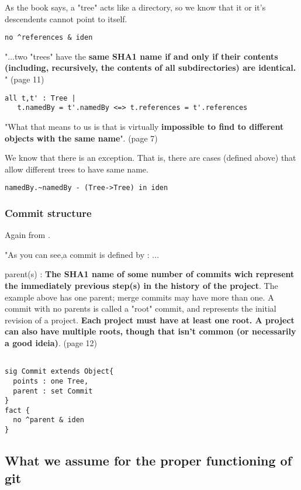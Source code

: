 As the book \cite{gitComm} says, a "tree" acts
like a directory, so we know that it or it's 
descendents cannot point to itself.
\begin{lstlisting}
no ^references & iden 
\end{lstlisting}

"...two "trees" have the { \bf same SHA1 name if and only if their
contents (including, recursively, the contents of all subdirectories)
are identical.} " (page 11)

\begin{lstlisting}
all t,t' : Tree | 
   t.namedBy = t'.namedBy <=> t.references = t'.references
\end{lstlisting}

"What that means to us is that is virtually {\bf impossible to find to 
different objects with the same name}". (page 7) \par
We know that there is an exception. That is,
there are cases (defined above)
that allow different trees to have same name. 

\begin{lstlisting}
namedBy.~namedBy - (Tree->Tree) in iden
\end{lstlisting}


\subsubsection{Commit structure}

Again from \cite{gitComm}. \par 
"As you can see,a commit is defined by :
... \par
parent(s) : {\bf The SHA1 name of some number of commits wich
represent the immediately previous step(s) in the 
history of the project}. The example above has one parent;
merge commits may have more than one. A commit with no 
parents is called a "root" commit, and represents the 
initial revision of a project. {\bf Each project must have at
least one root. A project can also have multiple roots,
though that isn't common (or necessarily a good ideia)}. (page 12)

\begin{lstlisting}

sig Commit extends Object{
  points : one Tree,
  parent : set Commit
}
fact {
  no ^parent & iden
}

\end{lstlisting}

\subsection{What we assume for the proper functioning of git}

